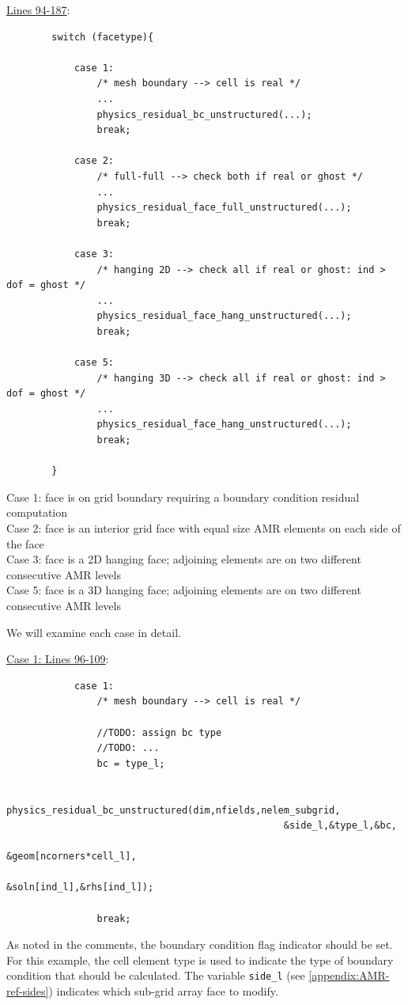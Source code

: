 \documentclass[11pt]{book}
\begin{document}
\noindent 
\underline{Lines 94-187}:
\begin{verbatim}
        switch (facetype){
            
            case 1:
                /* mesh boundary --> cell is real */
                ...
                physics_residual_bc_unstructured(...);
                break;
                
            case 2: 
                /* full-full --> check both if real or ghost */
                ...
                physics_residual_face_full_unstructured(...);
                break;
                
            case 3:
                /* hanging 2D --> check all if real or ghost: ind > dof = ghost */
                ...
                physics_residual_face_hang_unstructured(...);
                break;
                
            case 5:
                /* hanging 3D --> check all if real or ghost: ind > dof = ghost */
                ...
                physics_residual_face_hang_unstructured(...);
                break;
                
        }                
\end{verbatim}
Case 1: face is on grid boundary requiring a boundary condition residual computation\\
Case 2: face is an interior grid face with equal size AMR elements on each side of the face\\
Case 3: face is a 2D hanging face; adjoining elements are on two different consecutive AMR levels\\
Case 5: face is a 3D hanging face; adjoining elements are on two different consecutive AMR levels
\bigskip

\noindent
We will examine each case in detail.
\newpage

\noindent
\underline{Case 1: Lines 96-109}:
\begin{verbatim}
            case 1:
                /* mesh boundary --> cell is real */
                
                //TODO: assign bc type
                //TODO: ...
                bc = type_l;
                
                physics_residual_bc_unstructured(dim,nfields,nelem_subgrid,
                                                 &side_l,&type_l,&bc,
                                                 &geom[ncorners*cell_l],
                                                 &soln[ind_l],&rhs[ind_l]);
                
                break;
\end{verbatim}
As noted in the comments, the boundary condition flag indicator should be set. 
For this example, the cell element type is used to indicate the type of boundary condition that should be calculated.
The variable \texttt{side\_l} (see \ref{appendix:AMR-ref-sides}) indicates which sub-grid array face to modify.
\medskip
\end{document}
